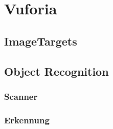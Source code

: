 \section{Vuforia}
\subsection{ImageTargets}
\subsection{Object Recognition}
\subsubsection{Scanner}
\subsubsection{Erkennung}
